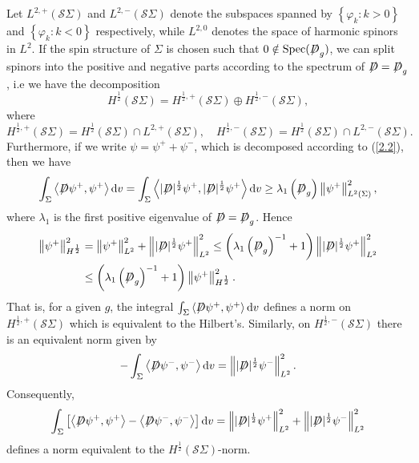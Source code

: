 \documentclass[a4paper, 12pt]{article}
\def\slashiii#1{\setbox0=\hbox{$#1$}#1\hskip-\wd0\hbox to\wd0{\hss\sl/\/\hss}}
\begin{document}
Let \( L^{2,+}(\mathcal{S}\Sigma) \) and \( L^{2,-} (\mathcal{S}\Sigma)\) denote the subspaces spanned by $\left\{ {{\varphi _k}:k > 0} \right\}$ and $\left\{ {{\varphi _k}:k < 0} \right\}$ respectively, while $L^{2,0}$ denotes the space of harmonic spinors in $L^2$. If the spin structure of $\Sigma$  is chosen such that $0\notin \operatorname{Spec}(\slashiii{D}_g)$, we can split spinors into the positive and negative parts according to the spectrum of $\slashiii{D}=\slashiii{D}_g$, i.e  we have the decomposition
\begin{equation}\label{2.2}
	H^{\frac{1}{2}}(\mathcal{S}\Sigma)=H^{\frac{1}{2},{+}}(\mathcal{S}\Sigma) \oplus H^{\frac{1}{2},{-}}(\mathcal{S}\Sigma),
\end{equation}
where
$$
H^{\frac{1}{2},{+}}(\mathcal{S}\Sigma)=H^{\frac{1}{2}}(\mathcal{S}\Sigma) \cap L^{2,+}(\mathcal{S}\Sigma),\quad H^{\frac{1}{2},{-}}(\mathcal{S}\Sigma)=H^{\frac{1}{2}}(\mathcal{S}\Sigma) \cap L^{2,-}(\mathcal{S}\Sigma).
$$
Furthermore, if we write $\psi=\psi^{+}+\psi^{-}$, which is decomposed according to (\ref{2.2}), then we have
\begin{equation}\label{spin-eqv-norm1}
	\int_\Sigma\left\langle\slashiii{D} \psi^{+}, \psi^{+}\right\rangle {\text{d}{v}}=\int_\Sigma\left\langle|\slashiii{D}|^{\frac{1}{2}} \psi^{+},|\slashiii{D}|^{\frac{1}{2}} \psi^{+}\right\rangle {\text{d}{v}} \geq \lambda_1\left(\slashiii{D} _g\right)\left\|\psi^{+}\right\|_{L^2(\Sigma)}^2,
\end{equation}
where $\lambda_1$ is the first positive eigenvalue of $\slashiii{D}=\slashiii{D}_g$. Hence
\begin{equation}\label{spin-eqv-norm2}
	\begin{aligned}
		\left\|\psi^{+}\right\|_{H^{\frac{1}{2}}}^2 & =\left\|\psi^{+}\right\|_{L^2}^2+\left\||\slashiii{D}|^{\frac{1}{2}} \psi^{+}\right\|_{L^2}^2
		\leq\left(\lambda_1\left(\slashiii{D}_g\right)^{-1}+1\right)\left\||\slashiii{D}|^{\frac{1}{2}} \psi^{+}\right\|_{L^2}^2\\ &\leq\left(\lambda_1\left(\slashiii{D}_g\right)^{-1}+1\right)\left\|\psi^{+}\right\|_{H^{\frac{1}{2}}}^2.
	\end{aligned}
\end{equation}
That is, for a given $g$, the integral $\int_\Sigma\left\langle\slashiii{D} \psi^{+}, \psi^{+}\right\rangle {\text{d}{v}}$ defines a norm on $H^{\frac{1}{2},+}(\mathcal{S} \Sigma)$ which is equivalent to the Hilbert's. Similarly, on $H^{\frac{1}{2},-}(\mathcal{S} \Sigma)$ there is an equivalent norm given by
$$
-\int_\Sigma\left\langle\slashiii{D} \psi^{-}, \psi^{-}\right\rangle {\text{d}{v}}=\left\||\slashiii{D}|^{\frac{1}{2}} \psi^{-}\right\|_{L^2}^2 .
$$
Consequently,
\begin{equation}\label{2.3}
	\int_\Sigma\left[\left\langle\slashiii{D} \psi^{+}, \psi^{+}\right\rangle-\left\langle\slashiii{D} \psi^{-}, \psi^{-}\right\rangle\right] {\text{d}{v}}=\left\||\slashiii{D}|^{\frac{1}{2}} \psi^{+}\right\|_{L^2}^2+\left\||\slashiii{D}|^{\frac{1}{2}} \psi^{-}\right\|_{L^2}^2
\end{equation}
defines a norm equivalent to the $H^{\frac{1}{2}}(\mathcal{S} \Sigma)$-norm.
\end{document}
